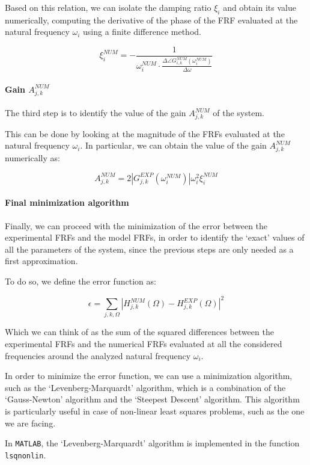 Based on this relation, we can isolate the damping ratio $\xi_i$ and obtain its value numerically, computing the derivative of the phase of the FRF evaluated at the natural frequency $\omega_i$ using a finite difference method.

\begin{equation}
    \xi_i^{NUM} = - \frac{1}{\omega_i^{NUM} \cdot \frac{\Delta \angle G_{i,k}^{NUM}(\omega_i^{NUM})}{\Delta \omega}}
\end{equation}

\paragraph{Gain $A_{j, k}^{NUM}$}

The third step is to identify the value of the gain $A_{j, k}^{NUM}$ of the system.

This can be done by looking at the magnitude of the FRFs evaluated at the natural frequency $\omega_i$.
In particular, we can obtain the value of the gain $A_{j, k}^{NUM}$ numerically as:

\begin{equation}
    A_{j, k}^{NUM} = 2 \left| G_{j, k}^{EXP}(\omega_i^{NUM}) \right| \omega_i^2 \xi_i^{NUM}
\end{equation}

\paragraph{Final minimization algorithm}

Finally, we can proceed with the minimization of the error between the experimental FRFs and the model FRFs, in order to identify the `exact' values of all the parameters of the system, since the previous steps are only needed as a first approximation.

To do so, we define the error function as:

\begin{equation}
    \epsilon = \sum_{j, k, \Omega} \left| H_{j, k}^{NUM}(\Omega) - H_{j, k}^{EXP}(\Omega) \right|^2
    \label{eq:error_function}
\end{equation}

Which we can think of as the sum of the squared differences between the experimental FRFs and the numerical FRFs evaluated at all the considered frequencies around the analyzed natural frequency $\omega_i$.

In order to minimize the error function, we can use a minimization algorithm, such as the `Levenberg-Marquardt' algorithm, which is a combination of the `Gauss-Newton' algorithm and the `Steepest Descent' algorithm.
This algorithm is particularly useful in case of non-linear least squares problems, such as the one we are facing.

In \texttt{MATLAB}, the `Levenberg-Marquardt' algorithm is implemented in the function \texttt{lsqnonlin}.
